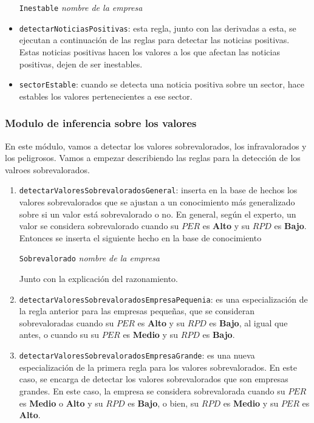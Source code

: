 \documentclass[10pt,spanish]{article}
\theoremstyle{plain}
\theoremstyle{definition}
\begin{document}
\begin{itemize}
    \begin{center}
        \texttt{Inestable} \textit{nombre de la empresa}
    \end{center}
    \item \texttt{detectarNoticiasPositivas}: esta regla, junto con las derivadas a esta, se ejecutan a continuación de las reglas para detectar las noticias positivas. Estas noticias positivas hacen los valores a los que afectan las noticias positivas, dejen de ser inestables. 
    \item \texttt{sectorEstable}: cuando se detecta una noticia positiva sobre un sector, hace estables los valores pertenecientes a ese sector.
\end{itemize}

\subsubsection{Modulo de inferencia sobre los valores}

En este módulo, vamos a detectar los valores sobrevalorados, los infravalorados y los peligrosos. Vamos a empezar describiendo las reglas para la detección de los valroes sobrevalorados.

\begin{enumerate}[---]
    \item \texttt{detectarValoresSobrevaloradosGeneral}: inserta en la base de hechos los valores sobrevalorados que se ajustan a un conocimiento más generalizado sobre si un valor está sobrevalorado o no. En general, según el experto, un valor se considera sobrevalorado cuando su $PER$ es \textbf{Alto} y su $RPD$ es \textbf{Bajo}. Entonces se inserta el siguiente hecho en la base de conocimiento
    \begin{center}
        \texttt{Sobrevalorado} \textit{nombre de la empresa}
    \end{center}
    Junto con la explicación del razonamiento.
    \item \texttt{detectarValoresSobrevaloradosEmpresaPequenia}: es una especialización de la regla anterior para las empresas pequeñas, que se consideran sobrevaloradas cuando su $PER$ es \textbf{Alto} y su $RPD$ es \textbf{Bajo}, al igual que antes, o cuando su su $PER$ es \textbf{Medio} y su $RPD$ es \textbf{Bajo}.
    \item \texttt{detectarValoresSobrevaloradosEmpresaGrande}: es una nueva especialización de la primera regla para los valores sobrevalorados. En este caso, se encarga de detectar los valores sobrevalorados que son empresas grandes. En este caso, la empresa se considera sobrevalorada cuando su $PER$ es \textbf{Medio} o \textbf{Alto} y su $RPD$ es \textbf{Bajo}, o bien, su $RPD$ es \textbf{Medio} y su $PER$ es \textbf{Alto}.
\end{enumerate}
\end{document}

